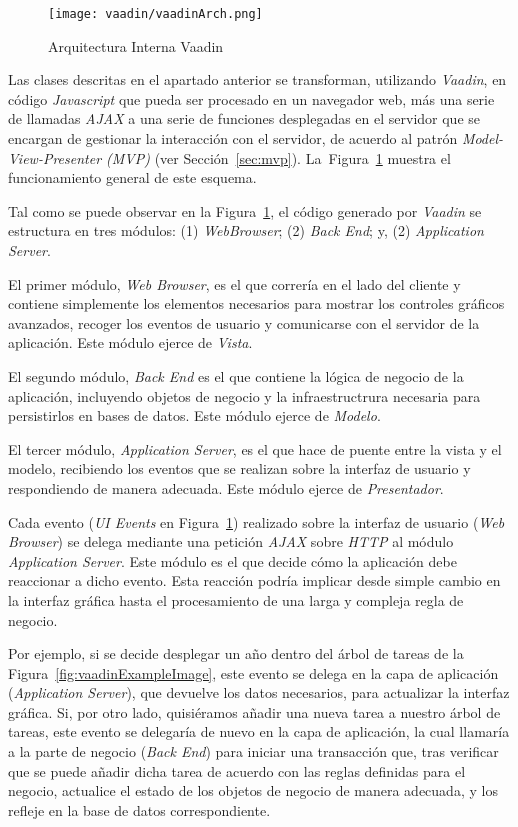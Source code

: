 \begin{figure}[H]
	\centering
	\texttt{[image: vaadin/vaadinArch.png]}
	\caption{Arquitectura Interna Vaadin}
	\label{fig:vaadinMVP}
\end{figure}

Las clases descritas en el apartado anterior se transforman, utilizando \emph{Vaadin}, en código \emph{Javascript} que pueda ser procesado en un navegador web, más una serie de llamadas \emph{AJAX} a una serie de funciones desplegadas en el servidor que se encargan de gestionar la interacción con el servidor, de acuerdo al patrón \emph{Model-View-Presenter (MVP)} (ver Sección~\ref{sec:mvp}). La~Figura~\ref{fig:vaadinMVP} muestra el funcionamiento general de este esquema.

Tal como se puede observar en la Figura~\ref{fig:vaadinMVP}, el código generado por \emph{Vaadin} se estructura en tres módulos: (1) \emph{WebBrowser}; (2) \emph{Back End}; y, (2) \emph{Application Server}.

El primer módulo, \emph{Web Browser}, es el que correría en el lado del cliente y contiene simplemente los elementos necesarios para mostrar los controles gráficos avanzados, recoger los eventos de usuario y comunicarse con el servidor de la aplicación. Este módulo ejerce de \emph{Vista}.

El segundo módulo, \emph{Back End} es el que contiene la lógica de negocio de la aplicación, incluyendo objetos de negocio y la infraestructrura necesaria para persistirlos en bases de datos. Este módulo ejerce de \emph{Modelo}.

El tercer módulo, \emph{Application Server}, es el que hace de puente entre la vista y el modelo, recibiendo los eventos que se realizan sobre la interfaz de usuario y respondiendo de manera adecuada. Este módulo ejerce de \emph{Presentador}.

Cada evento (\emph{UI Events} en Figura~\ref{fig:vaadinMVP}) realizado sobre la interfaz de usuario (\emph{Web Browser}) se delega mediante una petición \emph{AJAX} sobre \emph{HTTP} al módulo \emph{Application Server}. Este módulo es el que decide cómo la aplicación debe reaccionar a dicho evento. Esta reacción podría implicar desde simple cambio en la interfaz gráfica hasta el procesamiento de una larga y compleja regla de negocio. 

Por ejemplo, si se decide desplegar un año dentro del árbol de tareas de la Figura~\ref{fig:vaadinExampleImage}, este evento se delega en la capa de aplicación (\emph{Application Server}), que devuelve los datos necesarios, para actualizar la interfaz gráfica. Si, por otro lado, quisiéramos añadir una nueva tarea a nuestro árbol de tareas, este evento se delegaría de nuevo en la capa de aplicación, la cual llamaría a la parte de negocio (\emph{Back End}) para iniciar una transacción que, tras verificar que se puede añadir dicha tarea de acuerdo con las reglas definidas para el negocio, actualice el estado de los objetos de negocio de manera adecuada, y los refleje en la base de datos correspondiente. 



